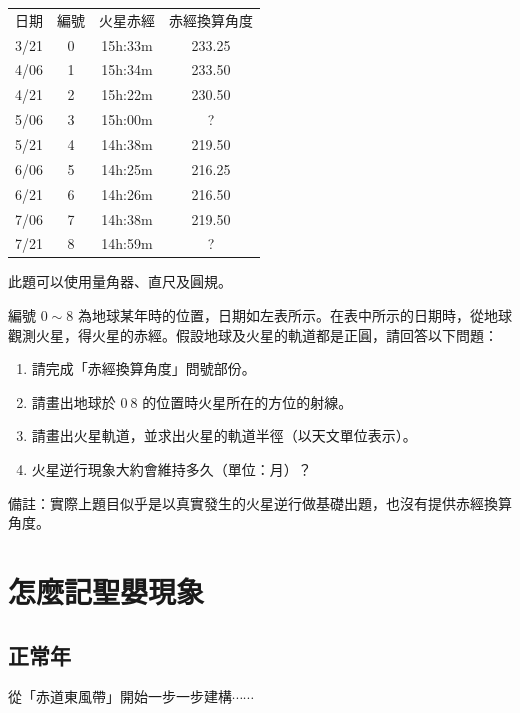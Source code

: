 \documentclass[12pt]{article}
\begin{document}
\begin{multicols}{2}

\begin{tabular}{c|c|c|c}
	日期 & 編號 & 火星赤經 & 赤經換算角度 \\
	3/21 & 0 & 15h:33m & 233.25 \\
	4/06 & 1 & 15h:34m & 233.50 \\
	4/21 & 2 & 15h:22m & 230.50 \\
	5/06 & 3 & 15h:00m & ? \\
	5/21 & 4 & 14h:38m & 219.50 \\
	6/06 & 5 & 14h:25m & 216.25 \\
	6/21 & 6 & 14h:26m & 216.50 \\
	7/06 & 7 & 14h:38m & 219.50 \\
	7/21 & 8 & 14h:59m & ?
\end{tabular}
\columnbreak

此題可以使用量角器、直尺及圓規。

編號 $0 \sim 8$ 為地球某年時的位置，日期如左表所示。在表中所示的日期時，從地球觀測火星，得火星的赤經。假設地球及火星的軌道都是正圓，請回答以下問題：

\begin{enumerate}
	\item 請完成「赤經換算角度」問號部份。
	\item 請畫出地球於 $0~8$ 的位置時火星所在的方位的射線。
	\item 請畫出火星軌道，並求出火星的軌道半徑（以天文單位表示）。
	\item 火星逆行現象大約會維持多久（單位：月）？
\end{enumerate}

\end{multicols}

備註：實際上題目似乎是以真實發生的火星逆行做基礎出題，也沒有提供赤經換算角度。

\pagebreak

\section{怎麼記聖嬰現象}

\subsection{正常年}

從「赤道東風帶」開始一步一步建構$\cdots\cdots$

\vspace{4cm}
\end{document}
